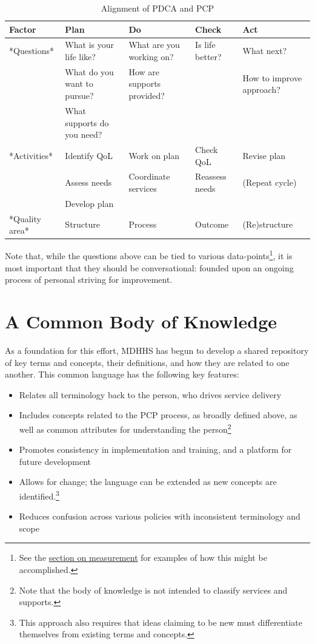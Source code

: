 \documentclass[
]{book}
\providecommand{\tightlist}{%
  \setlength{\itemsep}{0pt}\setlength{\parskip}{0pt}}
\begin{document}
\begin{table}

\caption{\label{tab:unnamed-chunk-6}Alignment of PDCA and PCP}
\centering
\begin{tabular}[t]{l|l|l|l|l}
\hline
Factor & Plan & Do & Check & Act\\
\hline
*Questions* & What is your life like? & What are you working on? & Is life better? & What next?\\
\hline
 & What do you want to pursue? & How are supports provided? &  & How to improve approach?\\
\hline
 & What supports do you need? &  &  & \\
\hline
*Activities* & Identify QoL & Work on plan & Check QoL & Revise plan\\
\hline
 & Assess needs & Coordinate services & Reassess needs & (Repeat cycle)\\
\hline
 & Develop plan &  &  & \\
\hline
*Quality area* & Structure & Process & Outcome & (Re)structure\\
\hline
\end{tabular}
\end{table}

Note that, while the questions above can be tied to various data-points\footnote{See the \protect\hyperlink{measure}{section on measurement} for examples of how this might be accomplished.}, it is most important that they should be conversational: founded upon an ongoing process of personal striving for improvement.

\hypertarget{bok}{%
\chapter{A Common Body of Knowledge}\label{bok}}

As a foundation for this effort, MDHHS has begun to develop a shared repository of key terms and concepts, their definitions, and how they are related to one another. This common language has the following key features:

\begin{itemize}
\tightlist
\item
  Relates all terminology back to the person, who drives service delivery
\item
  Includes concepts related to the PCP process, as broadly defined above, as well as common attributes for understanding the person\footnote{Note that the body of knowledge is not intended to classify services and supports.}
\item
  Promotes consistency in implementation and training, and a platform for future development
\item
  Allows for change; the language can be extended as new concepts are identified.\footnote{This approach also requires that ideas claiming to be new must differentiate themselves from existing terms and concepts.}
\item
  Reduces confusion across various policies with inconsistent terminology and scope
\end{itemize}
\end{document}
